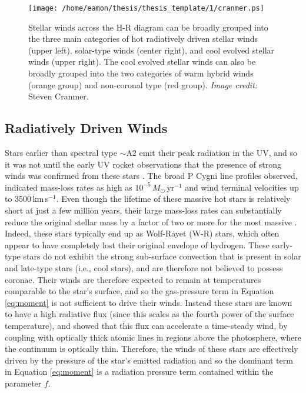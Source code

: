 \begin{figure}[hbt!]
\centering 
          \texttt{[image: /home/eamon/thesis/thesis\_template/1/cranmer.ps]}
\caption[Stellar winds across the H-R diagram]{Stellar winds across the H-R diagram can be broadly grouped into the three main categories of hot radiatively driven stellar winds (upper left), solar-type winds (center right), and cool evolved stellar winds (upper right). The cool evolved stellar winds can also be broadly grouped into the two categories of warm hybrid winds (orange group) and non-coronal type (red group). \textit{Image credit:} Steven Cranmer.}
\label{fig:1.2.3}
\end{figure}

\subsection{Radiatively Driven Winds}\label{sec:1.4.1}
Stars earlier than spectral type $\sim$A2 emit their peak radiation in the UV, and so it was not until the early UV rocket observations that the presence of strong winds was confirmed from these stars \citep[e.g.,][]{morton_1967}. The broad P Cygni line profiles observed, indicated mass-loss rates as high as $10^{-5}\,M_{\odot}$\,yr$^{-1}$ and wind terminal velocities up to 3500\,km\,s$^{-1}$. Even though the lifetime of these massive hot stars is relatively short at just a few million years, their large mass-loss rates can substantially reduce the original stellar mass by a factor of two or more for the most massive \citep{owocki_2004}. Indeed, these stars typically end up as Wolf-Rayet (W-R) stars, which often appear to have completely lost their original envelope of hydrogen. These early-type stars do not exhibit the strong sub-surface convection that is present in solar and late-type stars (i.e., cool stars), and are therefore not believed to possess coronae. Their winds are therefore expected to remain at temperatures comparable to the star's surface, and so the gas-pressure term in Equation \ref{eq:moment} is not sufficient to drive their winds. Instead these stars are known to have a high radiative flux (since this scales as the fourth power of the surface temperature), and \cite{castor_1975} showed that this flux can accelerate a time-steady wind, by coupling with optically thick atomic lines in regions above the photosphere, where the continuum is optically thin. Therefore, the winds of these stars are effectively driven by the pressure of the star's emitted radiation and so the dominant term in Equation \ref{eq:moment} is a radiation pressure term contained within the parameter $f$.

